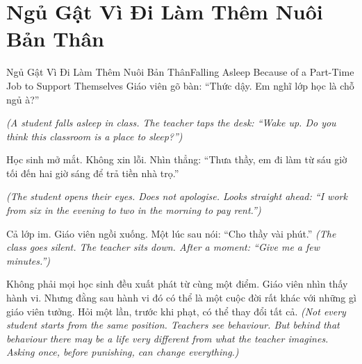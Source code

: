 \section{Ngủ Gật Vì Đi Làm Thêm Nuôi Bản Thân}
\begin{truyen}{Ngủ Gật Vì Đi Làm Thêm Nuôi Bản Thân}{Falling Asleep Because of a Part-Time Job to Support Themselves}
 Giáo viên gõ bàn: ``Thức dậy. Em nghĩ lớp học là chỗ ngủ à?''

\textit{(A student falls asleep in class. The teacher taps the desk: ``Wake up. Do you think this classroom is a place to sleep?'')}

Học sinh mở mắt. Không xin lỗi. Nhìn thẳng: ``Thưa thầy, em đi làm từ sáu giờ tối đến hai giờ sáng để trả tiền nhà trọ.''

\textit{(The student opens their eyes. Does not apologise. Looks straight ahead: ``I work from six in the evening to two in the morning to pay rent.'')}

Cả lớp im. Giáo viên ngồi xuống. Một lúc sau nói: ``Cho thầy vài phút.''
\textit{(The class goes silent. The teacher sits down. After a moment: ``Give me a few minutes.'')}

\begin{baihoc}
Không phải mọi học sinh đều xuất phát từ cùng một điểm. Giáo viên nhìn thấy hành vi. Nhưng đằng sau hành vi đó có thể là một cuộc đời rất khác với những gì giáo viên tưởng. Hỏi một lần, trước khi phạt, có thể thay đổi tất cả.
\textit{(Not every student starts from the same position. Teachers see behaviour. But behind that behaviour there may be a life very different from what the teacher imagines. Asking once, before punishing, can change everything.)}
\end{baihoc}
\end{truyen}

